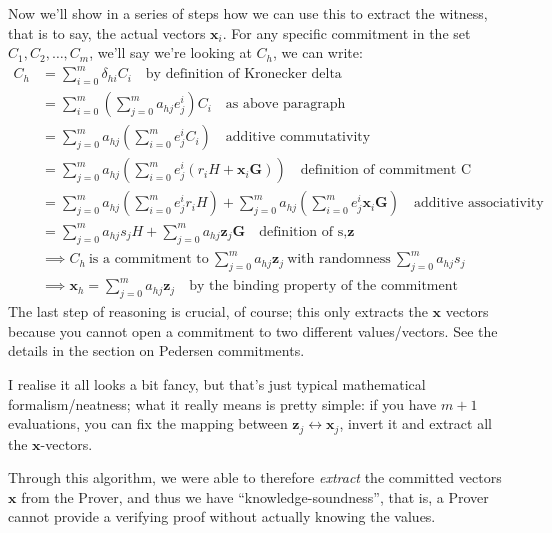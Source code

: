 \documentclass[10pt,a4paper]{article}
\begin{document}
Now we'll show in a series of steps how we can use this to extract the
witness, that is to say, the actual vectors $\mathbf{x}_i$. For any specific
commitment in the set $C_1, C_2, \ldots ,C_m$, we'll say we're looking at $C_h$, we can write:
\begin{align*}
  C_h  & = \sum\limits_{i=0}^{m}\delta_{hi}C_{i} \quad \textrm{by definition of Kronecker delta} \\
       & = \sum\limits_{i=0}^{m}\left(\sum\limits_{j=0}^{m}a_{hj}e_j^i\right)C_{i} \quad \textrm{as above paragraph} \\
       & = \sum\limits_{j=0}^{m}a_{hj}\left(\sum\limits_{i=0}^{m}e_j^i C_i\right) \quad \textrm{additive commutativity} \\
       & = \sum\limits_{j=0}^{m}a_{hj}\left(\sum\limits_{i=0}^{m}e_j^i \left(r_i H + \mathbf{x}_i \mathbf{G}\right)\right) \quad \textrm{definition of commitment C} \\
       & = \sum\limits_{j=0}^{m}a_{hj}\left(\sum\limits_{i=0}^{m}e_j^i r_i H\right) + \sum\limits_{j=0}^{m}a_{hj}\left(\sum\limits_{i=0}^{m}e_j^i \mathbf{x}_i \mathbf{G}\right) \quad \textrm{additive associativity} \\
       & = \sum\limits_{j=0}^{m} a_{hj}s_j H + \sum\limits_{j=0}^{m} a_{hj} \mathbf{z}_j \mathbf{G} \quad \textrm{definition of s,}\mathbf{z} \\
       & \implies C_h \ \textrm{is a commitment to} \ \sum\limits_{j=0}^{m}a_{hj}\mathbf{z}_j \ \textrm{with randomness} \ \sum\limits_{j=0}^{m} a_{hj}s_j \\
       & \implies \textbf{x}_h = \sum\limits_{j=0}^{m}a_{hj}\mathbf{z}_j \quad \textrm{by the binding property of the commitment}
\end{align*}
The last step of reasoning is crucial, of course; this only extracts the
$\mathbf{x}$ vectors because you cannot open a commitment to two different
values/vectors. See the details in the section on Pedersen commitments.

I realise it all looks a bit fancy, but that's just typical mathematical
formalism/neatness; what it really means is pretty simple: if you have
$m+1$ evaluations, you can fix the mapping between $\textbf{z}_j \leftrightarrow \textbf{x}_j$, invert it and extract all
the $\mathbf{x}$-vectors.

Through this algorithm, we were able to therefore \emph{extract} the
committed vectors $\mathbf{x}$ from the Prover, and thus we have
``knowledge-soundness'', that is, a Prover cannot provide a verifying
proof without actually knowing the values.
\end{document}

